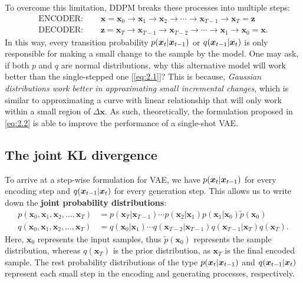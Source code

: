 To overcome this limitation, DDPM breaks these processes into multiple steps:
\begin{align}
    \mbox{ENCODER: }\quad&\bm{x}=\bm{x}_0\to\bm{x}_1\to\bm{x}_2\to\cdots\to\bm{x}_{T-1}\to\bm{x}_{T}=\bm{z}\nonumber\\
    \mbox{DECODER: }\quad &\bm{z}=\bm{x}_{T}\to\bm{x}_{T-1}\to\bm{x}_{T-2}\to\cdots\to\bm{x}_1\to\bm{x}_{0}=\bm{x}.\label{eq:2.2}
\end{align}
In this way, every transition probability $p(\bm{x}_{t}|\bm{x}_{t-1})$ or $q(\bm{x}_{t-1}|\bm{x}_{t})$  is only responsible for making a small change to the sample by the model. One may ask, if both $p$ and $q$ are normal distributions, why this alternative model will work better than the single-stepped one [\cref{eq:2.1}]? This is because, \emph{Gaussian distributions work better in approximating small incremental changes}, which is similar to approximating a curve with linear relationship that will only work within a small region of $\Delta\bm{x}$. As such, theoretically, the formulation proposed in \cref{eq:2.2} is able to improve the performance of a single-shot VAE.

\subsection{The joint KL divergence}
To arrive at a step-wise formulation for VAE, we have \textcolor{red}{$p(\bm{x}_{t}|\bm{x}_{t-1})$} for every encoding step and \textcolor{red}{$q(\bm{x}_{t-1}|\bm{x}_{t})$} for every generation step.
 This allows us to write down the \textbf{joint probability distributions}:
\begin{align}
p(\bm{x}_{0},\bm{x}_1,\bm{x}_2,\ldots,\bm{x}_T)&=p(\bm{x}_T|\bm{x}_{T-1})\cdots p(\bm{x}_2|\bm{x}_1)p(\bm{x}_1|\bm{x}_0)\tilde{p}(\bm{x}_{0})\nonumber\\
q(\bm{x}_{0},\bm{x}_1,\bm{x}_2,\ldots,\bm{x}_T)&=q(\bm{x}_0|\bm{x}_1)\cdots q(\bm{x}_{T-2}|\bm{x}_{T-1})q(\bm{x}_{T-1}|\bm{x}_{T})q(\bm{x}_T). \label{eq:2.3}
\end{align}
Here, $\bm{x}_0$ represents the input samples, thus $\tilde{p}(\bm{x}_0)$ represents the sample distribution, whereas $q(\bm{x}_T)$ is the prior distribution, as $\bm{x}_T$ is the final encoded sample. The rest probability distributions of the type $p(\bm{x}_{t}|\bm{x}_{t-1})$ and $q(\bm{x}_{t-1}|\bm{x}_{t})$ represent each small step in the encoding and generating processes, respectively.

